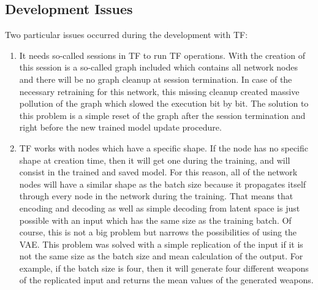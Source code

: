 \documentclass[MGS,Master,english]{twbook}%
\begin{document}
\subsection{Development Issues}
Two particular issues occurred during the development with \ac{TF}:
\begin{enumerate}
	\item It needs so-called sessions in \ac{TF} to run \ac{TF} operations. With the creation of this session is a so-called graph included which contains all network nodes and there will be no graph cleanup at session termination. In case of the necessary retraining for this network, this missing cleanup created massive pollution of the graph which slowed the execution bit by bit. The solution to this problem is a simple reset of the graph after the session termination and right before the new trained model update procedure.
	\item \ac{TF} works with nodes which have a specific shape. If the node has no specific shape at creation time, then it will get one during the training, and will consist in the trained and saved model. For this reason, all of the network nodes will have a similar shape as the batch size because it propagates itself through every node in the network during the training. That means that encoding and decoding as well as simple decoding from latent space is just possible with an input which has the same size as the training batch. Of course, this is not a big problem but narrows the possibilities of using the \ac{VAE}. This problem was solved with a simple replication of the input if it is not the same size as the batch size and mean calculation of the output. For example, if the batch size is four, then it will generate four different weapons of the replicated input and returns the mean values of the generated weapons.
\end{enumerate}
\end{document}
